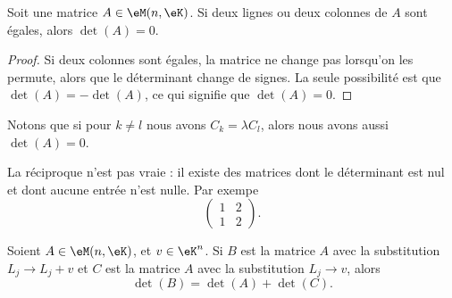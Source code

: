 \begin{corollary}        \label{CORooAZFCooSYINvBl}
    Soit une matrice \( A\in \eM(n,\eK)\). Si deux lignes ou deux colonnes de \( A\) sont égales, alors \( \det(A)=0\).
\end{corollary}

\begin{proof}
    Si deux colonnes sont égales, la matrice ne change pas lorsqu'on les permute, alors que le déterminant change de signes. La seule possibilité est que \( \det(A)=-\det(A)\), ce qui signifie que \( \det(A)=0\).
\end{proof}
Notons que si pour \( k\neq l\) nous avons \( C_k=\lambda C_l\), alors nous avons aussi \( \det(A)=0\).

La réciproque n'est pas vraie : il existe des matrices dont le déterminant est nul et dont aucune entrée n'est nulle. Par exempe
\begin{equation}
    \begin{pmatrix}
        1    &   2    \\ 
        1    &   2    
    \end{pmatrix}.
\end{equation}


\begin{proposition}      \label{PROPooNGZJooHjtMyn}
    Soient \( A\in \eM(n,\eK)\), et \( v\in \eK^n\). Si \( B\) est la matrice \( A\) avec la substitution \( L_j\to L_j+v\) et \( C\) est la matrice \( A\) avec la substitution \( L_j\to v\), alors
    \begin{equation}
        \det(B)=\det(A)+\det(C).
    \end{equation}
\end{proposition}

